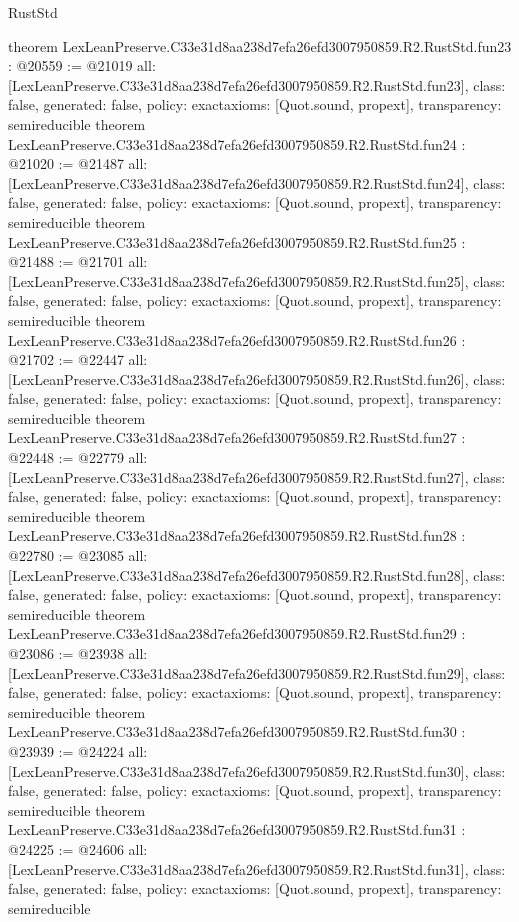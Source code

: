 \begin{lexlean}{RustStd}
\begin{coremodule}
{}
theorem LexLeanPreserve.C33e31d8aa238d7efa26efd3007950859.R2.RustStd.fun23 : @20559 := @21019 {
  all: [LexLeanPreserve.C33e31d8aa238d7efa26efd3007950859.R2.RustStd.fun23],
  class: false,
  generated: false,
  policy: exact{axioms: [Quot.sound, propext]},
  transparency: semireducible
}
theorem LexLeanPreserve.C33e31d8aa238d7efa26efd3007950859.R2.RustStd.fun24 : @21020 := @21487 {
  all: [LexLeanPreserve.C33e31d8aa238d7efa26efd3007950859.R2.RustStd.fun24],
  class: false,
  generated: false,
  policy: exact{axioms: [Quot.sound, propext]},
  transparency: semireducible
}
theorem LexLeanPreserve.C33e31d8aa238d7efa26efd3007950859.R2.RustStd.fun25 : @21488 := @21701 {
  all: [LexLeanPreserve.C33e31d8aa238d7efa26efd3007950859.R2.RustStd.fun25],
  class: false,
  generated: false,
  policy: exact{axioms: [Quot.sound, propext]},
  transparency: semireducible
}
theorem LexLeanPreserve.C33e31d8aa238d7efa26efd3007950859.R2.RustStd.fun26 : @21702 := @22447 {
  all: [LexLeanPreserve.C33e31d8aa238d7efa26efd3007950859.R2.RustStd.fun26],
  class: false,
  generated: false,
  policy: exact{axioms: [Quot.sound, propext]},
  transparency: semireducible
}
theorem LexLeanPreserve.C33e31d8aa238d7efa26efd3007950859.R2.RustStd.fun27 : @22448 := @22779 {
  all: [LexLeanPreserve.C33e31d8aa238d7efa26efd3007950859.R2.RustStd.fun27],
  class: false,
  generated: false,
  policy: exact{axioms: [Quot.sound, propext]},
  transparency: semireducible
}
theorem LexLeanPreserve.C33e31d8aa238d7efa26efd3007950859.R2.RustStd.fun28 : @22780 := @23085 {
  all: [LexLeanPreserve.C33e31d8aa238d7efa26efd3007950859.R2.RustStd.fun28],
  class: false,
  generated: false,
  policy: exact{axioms: [Quot.sound, propext]},
  transparency: semireducible
}
theorem LexLeanPreserve.C33e31d8aa238d7efa26efd3007950859.R2.RustStd.fun29 : @23086 := @23938 {
  all: [LexLeanPreserve.C33e31d8aa238d7efa26efd3007950859.R2.RustStd.fun29],
  class: false,
  generated: false,
  policy: exact{axioms: [Quot.sound, propext]},
  transparency: semireducible
}
theorem LexLeanPreserve.C33e31d8aa238d7efa26efd3007950859.R2.RustStd.fun30 : @23939 := @24224 {
  all: [LexLeanPreserve.C33e31d8aa238d7efa26efd3007950859.R2.RustStd.fun30],
  class: false,
  generated: false,
  policy: exact{axioms: [Quot.sound, propext]},
  transparency: semireducible
}
theorem LexLeanPreserve.C33e31d8aa238d7efa26efd3007950859.R2.RustStd.fun31 : @24225 := @24606 {
  all: [LexLeanPreserve.C33e31d8aa238d7efa26efd3007950859.R2.RustStd.fun31],
  class: false,
  generated: false,
  policy: exact{axioms: [Quot.sound, propext]},
  transparency: semireducible
}
\end{coremodule}
\end{lexlean}
